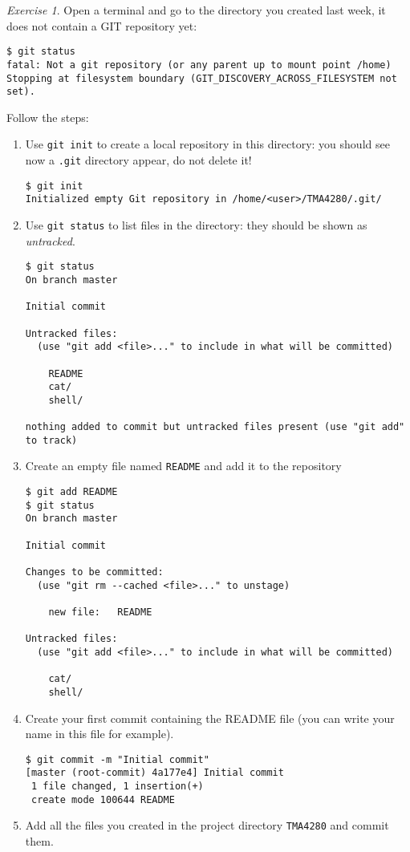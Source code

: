 \documentclass[onecolumn, oneside, a4paper, 11pt]{memoir}
\theoremstyle{remark}
\newtheorem{ex}{Exercise}
\begin{document}
\begin{ex}
Open a terminal and go to the directory you created last week, it does not contain a GIT repository yet:
\small{
\begin{lstlisting}[style=shell]
$ git status
fatal: Not a git repository (or any parent up to mount point /home)
Stopping at filesystem boundary (GIT_DISCOVERY_ACROSS_FILESYSTEM not set).
\end{lstlisting}
}

\bigskip
Follow the steps:
\begin{enumerate}
\item Use \texttt{git init} to create a local repository in this directory: you should see now a \texttt{.git} directory appear, do not delete it!
\small{
\begin{lstlisting}[style=shell]
$ git init
Initialized empty Git repository in /home/<user>/TMA4280/.git/
\end{lstlisting}
}

\medskip
\item Use \texttt{git status} to list files in the directory: they should be shown as \textit{untracked}.
\small{
\begin{lstlisting}[style=shell]
$ git status
On branch master

Initial commit

Untracked files:
  (use "git add <file>..." to include in what will be committed)

	README
	cat/
	shell/

nothing added to commit but untracked files present (use "git add" to track)
\end{lstlisting}
}
\medskip
\item Create an empty file named \texttt{README} and add it to the repository
\small{
\begin{lstlisting}[style=shell]
$ git add README 
$ git status
On branch master

Initial commit

Changes to be committed:
  (use "git rm --cached <file>..." to unstage)

	new file:   README

Untracked files:
  (use "git add <file>..." to include in what will be committed)

	cat/
	shell/
\end{lstlisting}
}
\item Create your first commit containing the README file (you can write your name in this file for example).
\small{
\begin{lstlisting}[style=shell]
$ git commit -m "Initial commit"
[master (root-commit) 4a177e4] Initial commit
 1 file changed, 1 insertion(+)
 create mode 100644 README
\end{lstlisting}
}
\medskip
\item Add all the files you created in the project directory \texttt{TMA4280} and commit them.


\end{enumerate}
\end{ex}
\end{document}
